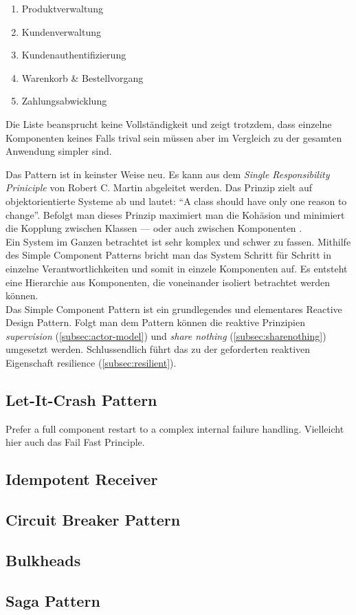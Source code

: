 \begin{enumerate}
\item Produktverwaltung
\item Kundenverwaltung
\item Kundenauthentifizierung
\item Warenkorb \& Bestellvorgang
\item Zahlungsabwicklung
\end{enumerate}

Die Liste beansprucht keine Vollständigkeit und zeigt trotzdem, dass einzelne Komponenten keines Falls trival sein müssen aber im Vergleich zu der gesamten Anwendung simpler sind.

\pagebreak

Das Pattern ist in keinster Weise neu. Es kann aus dem \textit{Single Responsibility Priniciple} von Robert C. Martin abgeleitet werden. Das Prinzip zielt auf objektorientierte Systeme ab und lautet: \enquote{A class should have only one reason to change}. Befolgt man dieses Prinzip maximiert man die Kohäsion und minimiert die Kopplung zwischen Klassen --- oder auch zwischen Komponenten \cite[S.~185]{kuhn_reactive_2015} \cite{martin_single_2014}.\\
Ein System im Ganzen betrachtet ist sehr komplex und schwer zu fassen. Mithilfe des Simple Component Patterns bricht man das System Schritt für Schritt in einzelne Verantwortlichkeiten und somit in einzele Komponenten auf. Es entsteht eine Hierarchie aus Komponenten, die voneinander isoliert betrachtet werden können.\\

Das Simple Component Pattern ist ein grundlegendes und elementares Reactive Design Pattern. Folgt man dem Pattern können die reaktive Prinzipien \textit{supervision} (\ref{subsec:actor-model}) und \textit{share nothing} (\ref{subsec:sharenothing}) umgesetzt werden. Schlussendlich führt das zu der geforderten reaktiven Eigenschaft resilience (\ref{subsec:resilient}).

\pagebreak

\subsection{Let-It-Crash Pattern}
Prefer a full component restart to a complex internal failure handling. Vielleicht hier auch das Fail Fast Principle.

\pagebreak

\subsection{Idempotent Receiver}

\pagebreak

\subsection{Circuit Breaker Pattern}

\pagebreak

\subsection{Bulkheads}

\pagebreak

\subsection{Saga Pattern}
